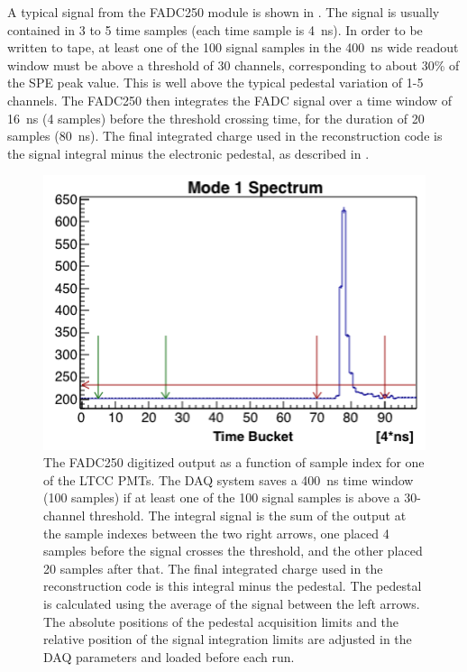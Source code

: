A typical signal from the FADC250 module is shown in . The signal is usually contained in 3 to 5 time samples
(each time sample is 4~ns). In order to be written to tape, at least one of the 100 signal samples in the 400~ns
wide readout window must be above a threshold of 30 channels, corresponding to about 30\% of the SPE peak value.
This is well above the typical pedestal variation of 1-5 channels. The FADC250 then integrates the FADC signal over
a time window of 16~ns (4 samples) before the threshold crossing time, for the duration of 20 samples (80~ns). The
final integrated charge used in the reconstruction code is the signal integral minus the electronic pedestal, as
described in .

\begin{figure}
	\centering
	\includegraphics[width=0.99\columnwidth,keepaspectratio]{img/fadc.png}
	\caption{The FADC250 digitized output as a function of sample index for one of the LTCC PMTs.
          The DAQ system saves a 400~ns time window (100 samples) if at least one of the 100 signal samples is
          above a 30-channel threshold. The integral signal is the sum of the output at the sample indexes between
          the two right arrows, one placed 4 samples before the signal crosses the threshold, and the other placed
          20 samples after that. The final integrated charge used in the reconstruction code is this integral minus
          the pedestal. The pedestal is calculated using the average of the signal between the left arrows. The
          absolute positions of the pedestal acquisition limits and the relative position of the signal integration
          limits are adjusted in the DAQ parameters and loaded before each run.}
	\label{fig:fadc}
\end{figure}

